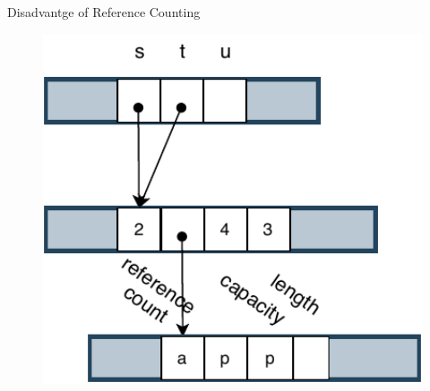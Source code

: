 \documentclass[9pt]{beamer}
\begin{document}
\begin{frame}[fragile]{Disadvantge of Reference Counting}
\begin{minipage}{0.3\linewidth}
\begin{figure}[hp]
        \end{figure}
    \end{minipage}     
    \begin{minipage}{0.3\linewidth}
        \begin{figure}[hp]
            \centering
            \begin{center}
                    \includegraphics[width=1.0\textwidth]{images/rc2.pdf}
                    \captionsetup{labelformat=empty}
            \end{center}
            

\end{figure}
\end{minipage}
\end{frame}
\end{document}
